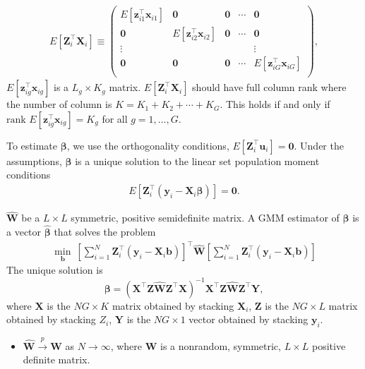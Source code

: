 \documentclass[11pt]{article}
\numberwithin{figure}{section}
\theoremstyle{definition}
\newcommand{\0}{\mathbf{0}}
\newcommand{\rank}{\text{rank }}
\newcommand{\bmW}{\bm{W}}
\newcommand{\bmX}{\bm{X}}
\newcommand{\bmY}{\bm{Y}}
\newcommand{\bmZ}{\bm{Z}}
\newcommand{\bmb}{\bm{b}}
\newcommand{\bmu}{\bm{u}}
\newcommand{\bmx}{\bm{x}}
\newcommand{\bmy}{\bm{y}}
\newcommand{\bmz}{\bm{z}}
\begin{document}
\begin{align*}
    E[\bmZ_i^\top \bmX_i] \equiv
    \begin{pmatrix}
        E[\bmz_{i1}^\top \bmx_{i1}] & \bm0 & \bm0 & \cdots & \bm0\\
        \bm0 & E[\bmz_{i2}^\top \bmx_{i2}] & \bm0 & \cdots & \bm0\\
        \vdots &  &  &  & \vdots\\
        \bm0 & \bm0 & \bm0 & \cdots & E[\bmz_{iG}^\top \bmx_{iG}]\\
    \end{pmatrix},
\end{align*}
$E[\bmz_{ig}^\top \bmx_{ig}]$ is a $L_g\times K_g$ matrix. $ E[\bmZ_i^\top \bmX_i]$ should have full column rank where the number of column is $K = K_1 + K_2 + \cdots +K_G$. This holds if and only if $\rank E[\bmz_{ig}^\top \bmx_{ig}] = K_g $ for all $g = 1,\ldots, G$.

To estimate $\bm{\beta}$, we use the orthogonality conditions, $E[\bmZ_i^\top \bmu_i] = \bm0$. Under the assumptions, $\bm{\beta}$ is a unique solution to the linear set population moment conditions
\begin{align*}
    E[\bmZ_i^\top (\bmy_i - \bmX_i \bm{\beta})] = \bm0.
\end{align*}


$\hat{\bmW}$ be a $L\times L$ symmetric, positive  semidefinite matrix. A  GMM estimator of $\bm{\beta}$ is a vector $\hat{\bm{\beta}}$ that solves the problem 
\begin{align*}
    \min_{\bmb}\ \left[ \sum_{i=1}^N \bmZ_i^\top (\bmy_i - \bmX_i \bmb)  \right]^\top \hat{\bmW} \left[ \sum_{i=1}^N \bmZ_i^\top (\bmy_i - \bmX_i \bmb)  \right]
\end{align*}
The unique solution is 
\[ \bm{\beta} = (\bmX^\top\bmZ\hat{\bmW}\bmZ^\top\bmX)^{-1}\bmX^\top\bmZ\hat{\bmW}\bmZ^\top\bmY,\]
where $\bmX$ is the $NG\times K$ matrix obtained by stacking $\bmX_i$, $\bmZ$ is the $NG\times L$ matrix obtained by stacking $Z_i$, $\bmY$ is the $NG\times 1 $ vector obtained by stacking $\bmy_i$.

\begin{itemize}
    \item $\hat{\bmW} \overset{p}{\rightarrow} \bmW$ as $N\rightarrow \infty$, where $\bmW$ is a nonrandom, symmetric, $L\times L$ positive definite matrix.  
\end{itemize}
\end{document}
